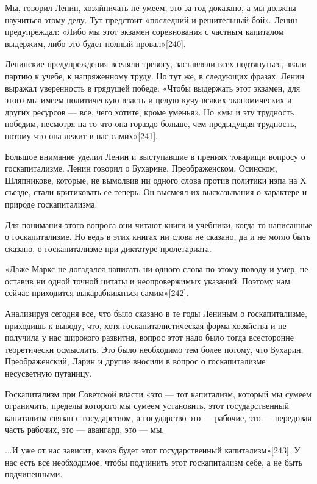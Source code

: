 \documentclass[12pt, a4paper, openany]{book}
\begin{document}
Мы, говорил Ленин, хозяйничать не умеем, это за год доказано, а мы должны научиться этому делу. Тут предстоит «последний и решительный бой». Ленин предупреждал: «Либо мы этот экзамен соревнования с частным капиталом выдержим, либо это будет полный провал»[240].

Ленинские предупреждения вселяли тревогу, заставляли всех подтянуться, звали партию к учебе, к напряженному труду. Но тут же, в следующих фразах, Ленин выражал уверенность в грядущей победе: «Чтобы выдержать этот экзамен, для этого мы имеем политическую власть и целую кучу всяких экономических и других ресурсов — все, чего хотите, кроме уменья». Но «мы и эту трудность победим, несмотря на то что она гораздо больше, чем предыдущая трудность, потому что она лежит в нас самих»[241].

Большое внимание уделил Ленин и выступавшие в прениях товарищи вопросу о госкапитализме. Ленин говорил о Бухарине, Преображенском, Осинском, Шляпникове, которые, не вымолвив ни одного слова против политики нэпа на X съезде, стали критиковать ее теперь. Он высмеял их высказывания о характере и природе госкапитализма.

Для понимания этого вопроса они читают книги и учебники, когда-то написанные о госкапитализме. Но ведь в этих книгах ни слова не сказано, да и не могло быть сказано, о госкапитализме при диктатуре пролетариата.

«Даже Маркс не догадался написать ни одного слова по этому поводу и умер, не оставив ни одной точной цитаты и неопровержимых указаний. Поэтому нам сейчас приходится выкарабкиваться самим»[242].

Анализируя сегодня все, что было сказано в те годы Лениным о госкапитализме, приходишь к выводу, что, хотя госкапиталистическая форма хозяйства и не получила у нас широкого развития, вопрос этот надо было тогда всесторонне теоретически осмыслить. Это было необходимо тем более потому, что Бухарин, Преображенский, Ларин и другие вносили в вопрос о госкапитализме несусветную путаницу.

Госкапитализм при Советской власти «это — тот капитализм, который мы сумеем ограничить, пределы которого мы сумеем установить, этот государственный капитализм связан с государством, а государство это — рабочие, это — передовая часть рабочих, это — авангард, это — мы.

...И уже от нас зависит, каков будет этот государственный капитализм»[243]. У нас есть все необходимое, чтобы подчинить этот госкапитализм себе, а не быть подчиненными.
\end{document}
